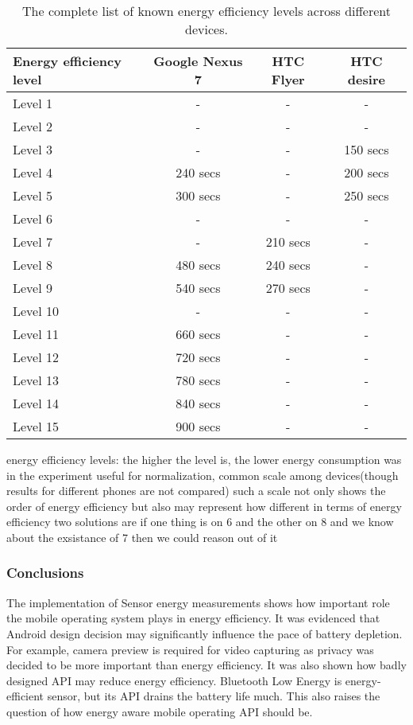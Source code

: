 \begin{center}
	\begin{table}
    \begin{tabular}{| l | c | c | c |}
    \hline
      Energy efficiency level & Google Nexus 7 & HTC Flyer & HTC desire \\ \hline
    Level 1 & -& - &  -\\ \hline
  	Level 2 & - & - & -\\ \hline
  	Level 3 & - & - & 150 secs\\ \hline
    Level 4 & 240 secs & - & 200 secs\\ \hline
    Level 5 & 300 secs & - & 250 secs \\ \hline
    Level 6 & - & - & - \\\hline
    Level 7 & - & 210 secs & - \\ \hline
    Level 8 & 480 secs & 240  secs & - \\ \hline
    Level 9 & 540 secs & 270 secs & - \\ \hline
    Level 10 & - & - & - \\ \hline
    Level 11 & 660 secs & - & - \\ \hline
    Level 12 & 720 secs & - & -\\ \hline
    Level 13 & 780 secs & - & - \\ \hline
    Level 14 & 840 secs & - & -\\ \hline
    Level 15 & 900 secs & -& -\\ \hline
    \end{tabular}
    \caption{The complete list of known energy efficiency levels across different devices.}
	\label{table:energy_efficiency_levels}
	\end{table}
\end{center}		
			
		energy efficiency levels:
			the higher the level is, the lower energy consumption was in the experiment
			useful for normalization, common scale among devices(though results for different phones are not compared)
			such a scale not only shows the order of energy efficiency
				but also may represent how different in terms of energy efficiency two solutions are
					if one thing is on 6 and the other on 8 and we know about the exsistance of 7 then we could reason out of it

   
\subsubsection{Conclusions}   
The implementation of Sensor energy measurements shows how important role the mobile operating system plays in energy efficiency. It was evidenced that Android design decision may significantly influence the pace of battery depletion. For example, camera preview is required for video capturing as privacy was decided to be more important than energy efficiency. It was also shown how badly designed API may reduce energy efficiency. Bluetooth Low Energy is energy-efficient sensor, but its API drains the battery life much. This also raises the question of how energy aware mobile operating API should be.

